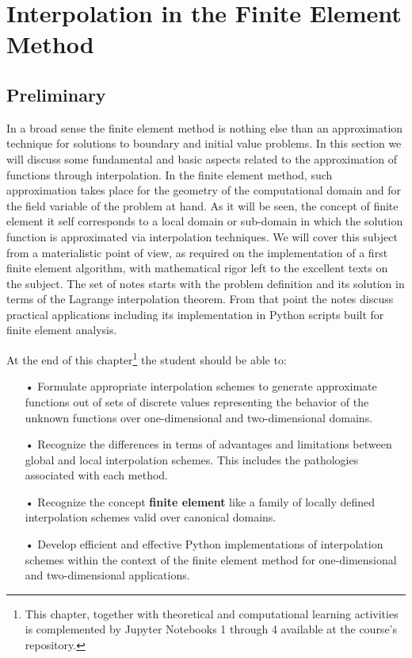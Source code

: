 \graphicspath{ {./img/TheFEM/} }
\chapter{Interpolation in the Finite Element Method}

\section*{Preliminary}
In a broad sense the finite element method is nothing else than an 
approximation technique for solutions to boundary and initial value problems. 
In this section we will discuss some fundamental and basic aspects related to 
the approximation of functions through interpolation. In the finite element 
method, such approximation takes place for the geometry of the computational 
domain and for the field variable of the problem at hand. As it will be seen, 
the concept of finite element it self corresponds to a local domain or 
sub-domain in which the solution function is approximated via interpolation 
techniques. We will cover this subject from a materialistic point of view, as 
required on the implementation of a first finite element algorithm, with 
mathematical rigor left to the excellent texts on the subject. The set of notes 
starts with the problem definition and its solution in terms of the Lagrange 
interpolation theorem. From that point the notes discuss practical applications 
including its implementation in Python scripts built for finite element 
analysis. 

At the end of this chapter\footnote{This chapter, together with theoretical and 
computational learning activities is complemented by Jupyter Notebooks 1 
through 4 available at the course's repository.} the student should be able to:


\begin{itemize}
\item[•] Formulate appropriate interpolation schemes to generate approximate functions out of sets of discrete values representing the behavior of the unknown functions over one-dimensional and two-dimensional domains.
\item[•] Recognize the differences in terms of advantages and limitations  between global and local interpolation schemes. This includes the pathologies associated with each method.
\item[•] Recognize the concept {\bf finite element} like a family of locally defined interpolation schemes valid over canonical domains.
\item[•] Develop efficient and effective  Python implementations of interpolation schemes within the context of the finite element method for one-dimensional and two-dimensional applications.
\end{itemize}  

